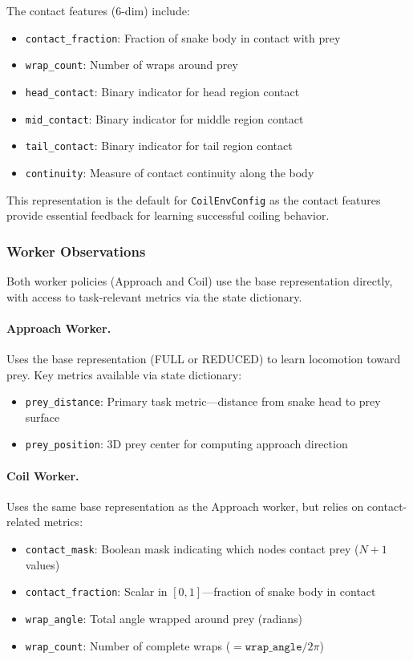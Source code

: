 \documentclass[11pt]{article}
\begin{document}
The contact features (6-dim) include:
\begin{itemize}
    \item \texttt{contact\_fraction}: Fraction of snake body in contact with prey
    \item \texttt{wrap\_count}: Number of wraps around prey
    \item \texttt{head\_contact}: Binary indicator for head region contact
    \item \texttt{mid\_contact}: Binary indicator for middle region contact
    \item \texttt{tail\_contact}: Binary indicator for tail region contact
    \item \texttt{continuity}: Measure of contact continuity along the body
\end{itemize}

This representation is the default for \texttt{CoilEnvConfig} as the contact features provide essential feedback for learning successful coiling behavior.

\subsubsection{Worker Observations}

Both worker policies (Approach and Coil) use the base representation directly, with access to task-relevant metrics via the state dictionary.

\paragraph{Approach Worker.}
Uses the base representation (FULL or REDUCED) to learn locomotion toward prey. Key metrics available via state dictionary:
\begin{itemize}
    \item \texttt{prey\_distance}: Primary task metric---distance from snake head to prey surface
    \item \texttt{prey\_position}: 3D prey center for computing approach direction
\end{itemize}

\paragraph{Coil Worker.}
Uses the same base representation as the Approach worker, but relies on contact-related metrics:
\begin{itemize}
    \item \texttt{contact\_mask}: Boolean mask indicating which nodes contact prey ($N+1$ values)
    \item \texttt{contact\_fraction}: Scalar in $[0, 1]$---fraction of snake body in contact
    \item \texttt{wrap\_angle}: Total angle wrapped around prey (radians)
    \item \texttt{wrap\_count}: Number of complete wraps ($= \texttt{wrap\_angle} / 2\pi$)
\end{itemize}
\end{document}
